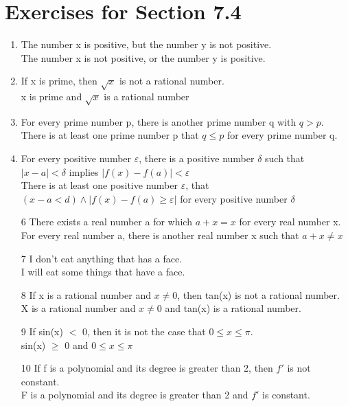 \documentclass[12pt]{article}
\begin{document}
\section*{Exercises for Section 7.4}
\begin{enumerate}
	\item The number x is positive, but the number y is not positive.\\
	    The number x is not positive, or the number y is positive.
	\item If x is prime, then $\sqrt{x}$ is not a rational number.\\
	    x is prime and $\sqrt{x}$ is a rational number
	\item For every prime number p, there is another prime number q with $q>p$.\\
	    There is at least one prime number p that $q\le p$ for every prime number q.
	\item For every positive number $\varepsilon$, there is a positive number $\delta$ such that $|x-a| < \delta$ implies $|f(x) - f(a)| < \varepsilon$\\
	    There is at least one positive number $\varepsilon$, that $(x-a < d) \land |f(x) - f(a) \ge \varepsilon|$ for every positive number $\delta$
	\item  [6] There exists a real number a for which $a+x=x$ for every real number x.\\
	    For every real number a, there is another real number x such that $a+x\ne x$
	\item  [7] I don't eat anything that has a face.\\
	    I will eat some things that have a face.
	\item  [8] If x is a rational number and $x \ne 0$, then tan(x) is not a rational number.\\
	    X is a rational number and $x\ne 0$ and tan(x) is a rational number.
	\item  [9] If sin(x) $<$ 0, then it is not the case that $0 \le x \le \pi$.\\
	    sin(x) $\ge$ 0 and $0 \le x \le \pi$
	\item  [10] If f is a polynomial and its degree is greater than 2, then $f'$ is not constant.\\
	    F is a polynomial and its degree is greater than 2 and $f'$ is constant.

\end{enumerate}
\end{document}
